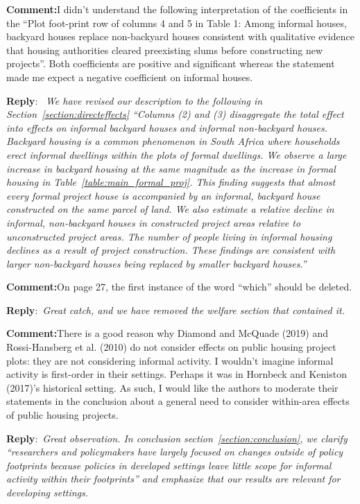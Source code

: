 \documentclass{article}
\newcommand{\reply}{\medskip \noindent \textbf{Reply}:\ \textit }
\newcommand{\sr}{\begin{minipage}{\dimexpr\textwidth-3cm}}
\newcommand{\er}{\end{minipage}}
\newcommand{\cc}{\medskip \noindent \textbf{Comment:}\hspace{2em}}
\begin{document}
\cc I didn't understand the following interpretation of the coefficients in the ``Plot foot-print row of columns 4 and 5 in Table 1: Among informal houses, backyard houses replace non-backyard houses consistent with qualitative evidence that housing authorities cleared preexisting slums before constructing new projects''. Both coefficients are positive and significant whereas the statement made me expect a negative coefficient on informal houses.

\sr
\reply{ We have revised our description to the following in Section~\ref{section:directeffects} ``Columns (2) and (3) disaggregate the total effect into effects on informal backyard houses and informal non-backyard houses.  Backyard housing is a common phenomenon in South Africa where households erect informal dwellings within the plots of formal dwellings.  We observe a large increase in backyard housing at the same magnitude as the increase in formal housing in Table~\ref{table:main_formal_proj}.  This finding suggests that almost every formal project house is accompanied by an informal, backyard house constructed on the same parcel of land.  We also estimate a relative decline in informal, non-backyard houses in constructed project areas relative to unconstructed project areas.  The number of people living in informal housing declines as a result of project construction.  These findings are consistent with larger non-backyard houses being replaced by smaller backyard houses.'' }\\
\er

\cc On page 27, the first instance of the word ``which'' should be deleted.

\sr
\reply{Great catch, and we have removed the welfare section that contained it.}\\
\er

\cc There is a good reason why Diamond and McQuade (2019) and Rossi-Hansberg et al. (2010) do not consider effects on public housing project plots: they are not considering informal activity. I wouldn't imagine informal activity is first-order in their settings. Perhaps it was in Hornbeck and Keniston (2017)'s historical setting. As such, I would like the authors to moderate their statements in the conclusion about a general need to consider within-area effects of public housing projects.

\sr
\reply{Great observation.  In conclusion section~\ref{section:conclusion}, we clarify ``researchers and policymakers have largely focused on changes outside of policy footprints because policies in developed settings leave little scope for informal activity within their footprints'' and emphasize that our results are relevant for developing settings.}
\er
\end{document}
